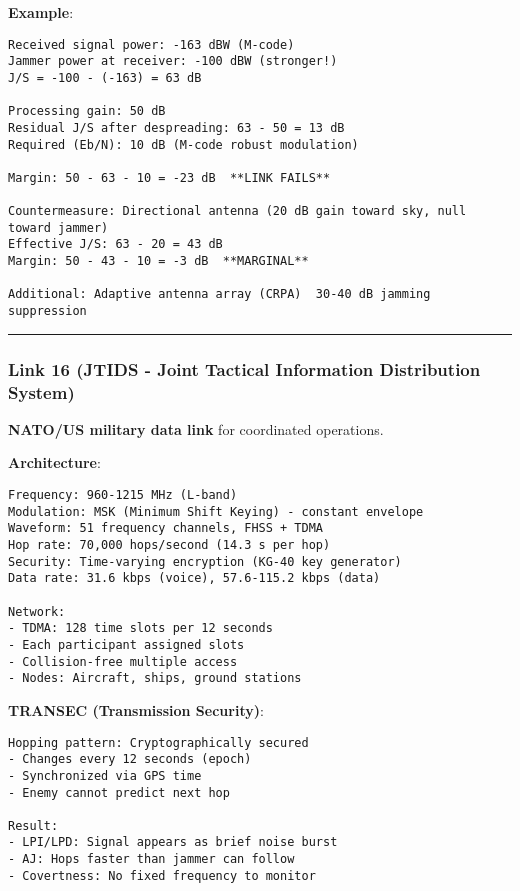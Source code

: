\textbf{Example}:

\begin{verbatim}
Received signal power: -163 dBW (M-code)
Jammer power at receiver: -100 dBW (stronger!)
J/S = -100 - (-163) = 63 dB

Processing gain: 50 dB
Residual J/S after despreading: 63 - 50 = 13 dB
Required (Eb/N): 10 dB (M-code robust modulation)

Margin: 50 - 63 - 10 = -23 dB  **LINK FAILS**

Countermeasure: Directional antenna (20 dB gain toward sky, null toward jammer)
Effective J/S: 63 - 20 = 43 dB
Margin: 50 - 43 - 10 = -3 dB  **MARGINAL**

Additional: Adaptive antenna array (CRPA)  30-40 dB jamming suppression
\end{verbatim}

\begin{center}\rule{0.5\linewidth}{0.5pt}\end{center}

\subsubsection{Link 16 (JTIDS - Joint Tactical Information Distribution
System)}\label{link-16-jtids---joint-tactical-information-distribution-system}

\textbf{NATO/US military data link} for coordinated operations.

\textbf{Architecture}:

\begin{verbatim}
Frequency: 960-1215 MHz (L-band)
Modulation: MSK (Minimum Shift Keying) - constant envelope
Waveform: 51 frequency channels, FHSS + TDMA
Hop rate: 70,000 hops/second (14.3 s per hop)
Security: Time-varying encryption (KG-40 key generator)
Data rate: 31.6 kbps (voice), 57.6-115.2 kbps (data)

Network:
- TDMA: 128 time slots per 12 seconds
- Each participant assigned slots
- Collision-free multiple access
- Nodes: Aircraft, ships, ground stations
\end{verbatim}

\textbf{TRANSEC (Transmission Security)}:

\begin{verbatim}
Hopping pattern: Cryptographically secured
- Changes every 12 seconds (epoch)
- Synchronized via GPS time
- Enemy cannot predict next hop

Result:
- LPI/LPD: Signal appears as brief noise burst
- AJ: Hops faster than jammer can follow
- Covertness: No fixed frequency to monitor
\end{verbatim}

